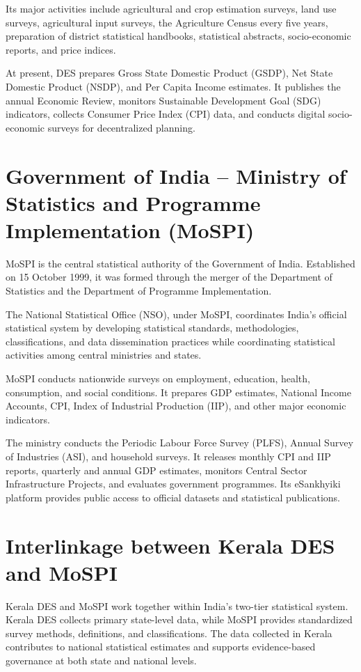 \documentclass[12pt]{article}
\begin{document}
Its major activities include agricultural and crop estimation surveys, land use surveys, agricultural input surveys, the Agriculture Census every five years, preparation of district statistical handbooks, statistical abstracts, socio-economic reports, and price indices.

At present, DES prepares Gross State Domestic Product (GSDP), Net State Domestic Product (NSDP), and Per Capita Income estimates. It publishes the annual Economic Review, monitors Sustainable Development Goal (SDG) indicators, collects Consumer Price Index (CPI) data, and conducts digital socio-economic surveys for decentralized planning.

\section*{Government of India -- Ministry of Statistics and Programme Implementation (MoSPI)}

MoSPI is the central statistical authority of the Government of India. Established on 15 October 1999, it was formed through the merger of the Department of Statistics and the Department of Programme Implementation.

The National Statistical Office (NSO), under MoSPI, coordinates India's official statistical system by developing statistical standards, methodologies, classifications, and data dissemination practices while coordinating statistical activities among central ministries and states.

MoSPI conducts nationwide surveys on employment, education, health, consumption, and social conditions. It prepares GDP estimates, National Income Accounts, CPI, Index of Industrial Production (IIP), and other major economic indicators.

The ministry conducts the Periodic Labour Force Survey (PLFS), Annual Survey of Industries (ASI), and household surveys. It releases monthly CPI and IIP reports, quarterly and annual GDP estimates, monitors Central Sector Infrastructure Projects, and evaluates government programmes. Its eSankhyiki platform provides public access to official datasets and statistical publications.

\section*{Interlinkage between Kerala DES and MoSPI}

Kerala DES and MoSPI work together within India's two-tier statistical system. Kerala DES collects primary state-level data, while MoSPI provides standardized survey methods, definitions, and classifications. The data collected in Kerala contributes to national statistical estimates and supports evidence-based governance at both state and national levels.
\end{document}
